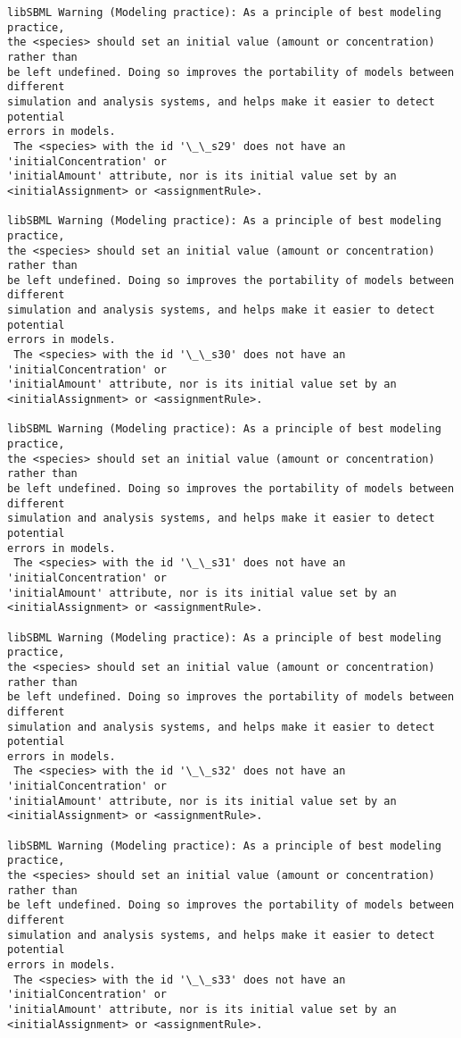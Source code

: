 \documentclass[11pt]{article}
\begin{document}
\begin{Verbatim}[commandchars=\\\{\}]
libSBML Warning (Modeling practice): As a principle of best modeling practice,
the <species> should set an initial value (amount or concentration) rather than
be left undefined. Doing so improves the portability of models between different
simulation and analysis systems, and helps make it easier to detect potential
errors in models.
 The <species> with the id '\_\_s29' does not have an 'initialConcentration' or
'initialAmount' attribute, nor is its initial value set by an
<initialAssignment> or <assignmentRule>.

libSBML Warning (Modeling practice): As a principle of best modeling practice,
the <species> should set an initial value (amount or concentration) rather than
be left undefined. Doing so improves the portability of models between different
simulation and analysis systems, and helps make it easier to detect potential
errors in models.
 The <species> with the id '\_\_s30' does not have an 'initialConcentration' or
'initialAmount' attribute, nor is its initial value set by an
<initialAssignment> or <assignmentRule>.

libSBML Warning (Modeling practice): As a principle of best modeling practice,
the <species> should set an initial value (amount or concentration) rather than
be left undefined. Doing so improves the portability of models between different
simulation and analysis systems, and helps make it easier to detect potential
errors in models.
 The <species> with the id '\_\_s31' does not have an 'initialConcentration' or
'initialAmount' attribute, nor is its initial value set by an
<initialAssignment> or <assignmentRule>.

libSBML Warning (Modeling practice): As a principle of best modeling practice,
the <species> should set an initial value (amount or concentration) rather than
be left undefined. Doing so improves the portability of models between different
simulation and analysis systems, and helps make it easier to detect potential
errors in models.
 The <species> with the id '\_\_s32' does not have an 'initialConcentration' or
'initialAmount' attribute, nor is its initial value set by an
<initialAssignment> or <assignmentRule>.

libSBML Warning (Modeling practice): As a principle of best modeling practice,
the <species> should set an initial value (amount or concentration) rather than
be left undefined. Doing so improves the portability of models between different
simulation and analysis systems, and helps make it easier to detect potential
errors in models.
 The <species> with the id '\_\_s33' does not have an 'initialConcentration' or
'initialAmount' attribute, nor is its initial value set by an
<initialAssignment> or <assignmentRule>.


\end{Verbatim}
\end{document}
